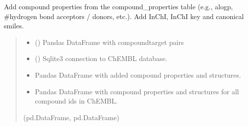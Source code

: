 \documentclass[letterpaper,10pt,english]{sphinxmanual}
\begin{document}

\begin{fulllineitems}
\label{\detokenize{add_chembl_compound_properties:add_chembl_compound_properties.add_chembl_properties_and_structures}}
\pysigstartsignatures
{}
\pysigstopsignatures
\sphinxAtStartPar
Add compound properties from the compound\_properties table (e.g., alogp, \#hydrogen bond acceptors / donors, etc.).
Add InChI, InChI key and canonical smiles.
\begin{quote}\begin{description}
\begin{itemize}
\item {} 
\sphinxAtStartPar
{} () \textendash{} Pandas DataFrame with compound\sphinxhyphen{}target pairs

\item {} 
\sphinxAtStartPar
{} () \textendash{} Sqlite3 connection to ChEMBL database.

\end{itemize}

\sphinxAtStartPar
\begin{itemize}
\item {} 
\sphinxAtStartPar
Pandas DataFrame with added compound properties and structures. 

\item {} 
\sphinxAtStartPar
Pandas DataFrame with compound properties and structures for all compound ids in ChEMBL.

\end{itemize}


\sphinxAtStartPar
(pd.DataFrame, pd.DataFrame)

\end{description}\end{quote}

\end{fulllineitems}
\end{document}
